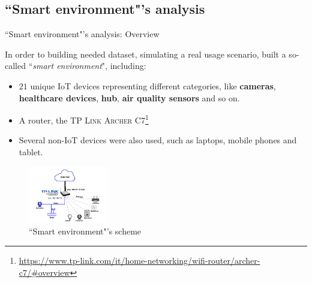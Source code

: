 \documentclass[10pt]{beamer}
\begin{document}
\subsection{``Smart environment"'s analysis}
\begin{frame}{``Smart environment"'s analysis: Overview}

In order to building needed dataset, simulating a real usage scenario, \citet{ITPAReport} built a so-called ``\textit{smart environment}", including:

\begin{itemize}
\justifying
\item $21$ unique IoT devices representing different categories, like \textbf{cameras}, \textbf{healthcare devices}, \textbf{hub}, \textbf{air quality sensors} and so on.

\item A router, the \textsc{TP Link Archer C7}\footnote{\tiny\url{https://www.tp-link.com/it/home-networking/wifi-router/archer-c7/\#overview}}

\item Several non-IoT devices were also used, such as laptops, mobile phones and tablet.

\end{itemize}

\begin{figure}
  \caption{``Smart environment"'s scheme}
  \includegraphics[width=100pt]{Topology.png}
\end{figure}

\end{frame} 
\end{document}
